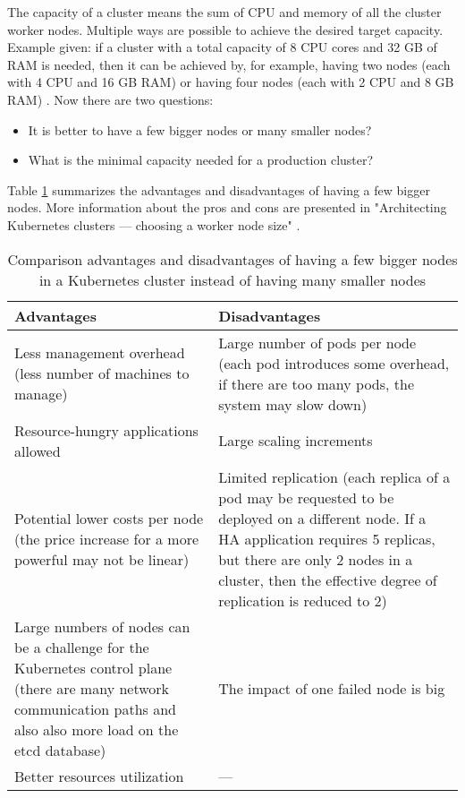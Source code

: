 The capacity of a cluster means the sum of CPU and memory of all the cluster worker nodes. Multiple ways are possible to achieve the desired target capacity. Example given: if a cluster with a total capacity of 8 CPU cores and 32 GB of RAM is needed, then it can be achieved by, for example, having two nodes (each with 4 CPU and 16 GB RAM) or having four nodes (each with 2 CPU and 8 GB RAM) \cite{kubernetes-node-size}. Now there are two questions:
\begin{itemize}
\item It is better to have a few bigger nodes or many smaller nodes?
\item What is the minimal capacity needed for a production cluster?
\end{itemize}

Table \ref{tab:pros-cons-large-nodes} summarizes the advantages and disadvantages of having a few bigger nodes. More information about the pros and cons are presented in "Architecting Kubernetes clusters — choosing a worker node size" \cite{kubernetes-node-size}.

\begin{table}[H]
\small{
\captionsetup{justification=centering}
\caption{\label{tab:pros-cons-large-nodes}Comparison advantages and disadvantages of having a few bigger nodes in a Kubernetes cluster instead of having many smaller nodes \cite{kubernetes-node-size}}
\begin{tabularx}{1\textwidth} {
  | >{\centering\arraybackslash}X
  | >{\centering\arraybackslash}X | }
 \hline
  \textbf{Advantages} & \textbf{Disadvantages}  \\
 \hline
 Less management overhead (less number of machines to manage)  & Large number of pods per node (each pod introduces some overhead, if there are too many pods, the system may slow down)   \\
 \hline
 Resource-hungry applications allowed  & Large scaling increments  \\
 \hline
  Potential lower costs per node (the price increase for a more powerful may not be linear)  & Limited replication (each replica of a pod may be requested to be deployed on a different node. If a HA application requires 5 replicas, but there are only 2 nodes in a cluster, then the effective degree of replication is reduced to 2)  \\
 \hline
  Large numbers of nodes can be a challenge for the Kubernetes control plane (there are many network communication paths and also also more load on the etcd database) & The impact of one failed node is big   \\
 \hline
  Better resources utilization & ---  \\
 \hline
\end{tabularx}
}
\end{table}

